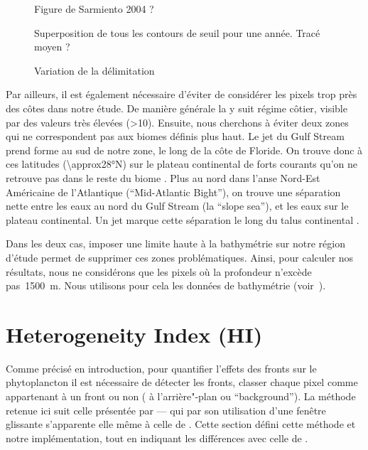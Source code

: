\begin{figure}
  \caption{Figure de Sarmiento 2004 ?}
  \label{fig:sarmiento}
\end{figure}

\begin{figure}
  Superposition de tous les contours de seuil pour une année.
  Tracé moyen ?
  \caption{Variation de la délimitation}
  \label{fig:var-delim}
\end{figure}

Par ailleurs, il est également nécessaire d'éviter de considérer les pixels trop près des côtes dans notre étude.
De manière générale la  y suit régime côtier, visible par des valeurs très élevées (\qty{>10}{\mgm}).
Ensuite, nous cherchons à éviter deux zones qui ne correspondent pas aux biomes définis plus haut.
Le jet du Gulf Stream prend forme au sud de notre zone, le long de la côte de Floride. On trouve donc à ces latitudes (\ang{\approx28}N) sur le plateau continental de forts courants qu'on ne retrouve pas dans le reste du biome .
Plus au nord dans l'anse Nord-Est Américaine de l'Atlantique (\enquote{Mid-Atlantic Bight}), on trouve une séparation nette entre les eaux au nord du Gulf Stream (la \enquote{slope sea}), et les eaux sur le plateau continental.
Un jet marque cette séparation le long du talus continental \parencite{flagg_2006}.

Dans les deux cas, imposer une limite haute à la bathymétrie sur notre région d'étude permet de supprimer ces zones problématiques.
Ainsi, pour calculer nos résultats, nous ne considérons que les pixels où la profondeur n'excède pas~\qty{1500}{\m}.
Nous utilisons pour cela les données de bathymétrie  (voir~).

\section{Heterogeneity Index (HI)}
\label{sec:HI}

Comme précisé en introduction, pour quantifier l'effets des fronts sur le phytoplancton il est nécessaire de détecter les fronts,  classer chaque pixel comme appartenant à un front ou non ( à l'arrière"-plan ou \enquote{background}).
La méthode retenue ici suit celle présentée par \textcite{liu_2016} --- qui par son utilisation d'une fenêtre glissante s'apparente elle même à celle de \textcite{cayula_1992}.
Cette section défini cette méthode et notre implémentation, tout en indiquant les différences avec celle de \textcite{liu_2016}.

